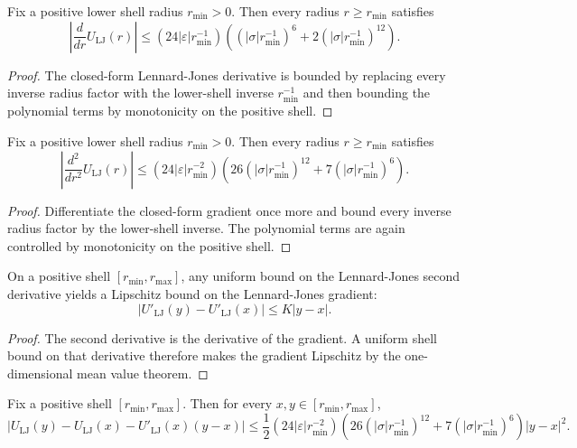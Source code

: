 \begin{theorem}\label{thm:lj-shell-derivative-envelope}
Fix a positive lower shell radius $r_{\min}>0$. Then every radius $r \ge r_{\min}$ satisfies
\[
\left|\frac{d}{dr}U_{\mathrm{LJ}}(r)\right|
\le
\left(24|\varepsilon|r_{\min}^{-1}\right)
\left((|\sigma|r_{\min}^{-1})^6 + 2(|\sigma|r_{\min}^{-1})^{12}\right).
\]
\end{theorem}

\begin{proof}
The closed-form Lennard-Jones derivative is bounded by replacing every inverse radius factor with the lower-shell inverse $r_{\min}^{-1}$ and then bounding the polynomial terms by monotonicity on the positive shell.
\end{proof}

\begin{theorem}\label{thm:lj-shell-second-derivative-envelope}
Fix a positive lower shell radius $r_{\min}>0$. Then every radius $r \ge r_{\min}$ satisfies
\[
\left|\frac{d^2}{dr^2}U_{\mathrm{LJ}}(r)\right|
\le
\left(24|\varepsilon|r_{\min}^{-2}\right)
\left(26(|\sigma|r_{\min}^{-1})^{12} + 7(|\sigma|r_{\min}^{-1})^6\right).
\]
\end{theorem}

\begin{proof}
Differentiate the closed-form gradient once more and bound every inverse radius factor by the lower-shell inverse. The polynomial terms are again controlled by monotonicity on the positive shell.
\end{proof}

\begin{theorem}\label{thm:lj-shell-hessian-lipschitz}
On a positive shell $[r_{\min},r_{\max}]$, any uniform bound on the Lennard-Jones second derivative yields a Lipschitz bound on the Lennard-Jones gradient:
\[
|U'_{\mathrm{LJ}}(y)-U'_{\mathrm{LJ}}(x)| \le K|y-x|.
\]
\end{theorem}

\begin{proof}
The second derivative is the derivative of the gradient. A uniform shell bound on that derivative therefore makes the gradient Lipschitz by the one-dimensional mean value theorem.
\end{proof}

\begin{theorem}\label{thm:lj-shell-quadratic-remainder}
Fix a positive shell $[r_{\min}, r_{\max}]$. Then for every $x,y \in [r_{\min}, r_{\max}]$,
\[
|U_{\mathrm{LJ}}(y)-U_{\mathrm{LJ}}(x)-U'_{\mathrm{LJ}}(x)(y-x)|
\le
\frac{1}{2}
\left(24|\varepsilon|r_{\min}^{-2}\right)
\left(26(|\sigma|r_{\min}^{-1})^{12} + 7(|\sigma|r_{\min}^{-1})^6\right)
|y-x|^2.
\]
\end{theorem}

